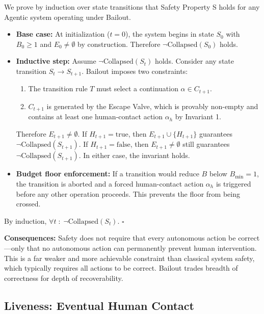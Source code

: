 \begin{Proof}
We prove by induction over state transitions that Safety Property S holds for any Agentic system operating under Bailout.

\begin{itemize}
    \item \textbf{Base case:} At initialization ($t=0$), the system begins in state $S_0$ with $B_0 \geq 1$ and $E_0 \neq \emptyset$ by construction. Therefore $\neg\text{Collapsed}(S_0)$ holds.

    \item \textbf{Inductive step:} Assume $\neg\text{Collapsed}(S_t)$ holds. Consider any state transition $S_t \to S_{t+1}$. Bailout imposes two constraints:
    \begin{enumerate}
        \item The transition rule $T$ must select a continuation $\alpha \in C_{t+1}$.
        \item $C_{t+1}$ is generated by the Escape Valve, which is provably non-empty and contains at least one human-contact action $\alpha_h$ by Invariant 1.
    \end{enumerate}
    Therefore $E_{t+1} \neq \emptyset$. If $H_{t+1}=\text{true}$, then $E_{t+1} \cup \{H_{t+1}\}$ guarantees $\neg\text{Collapsed}(S_{t+1})$. If $H_{t+1}=\text{false}$, then $E_{t+1} \neq \emptyset$ still guarantees $\neg\text{Collapsed}(S_{t+1})$. In either case, the invariant holds.

    \item \textbf{Budget floor enforcement:} If a transition would reduce $B$ below $B_\text{min}=1$, the transition is aborted and a forced human-contact action $\alpha_h$ is triggered before any other operation proceeds. This prevents the floor from being crossed.
\end{itemize}

By induction, $\forall t \;:\; \neg\text{Collapsed}(S_t)$. $\square$
\end{Proof}

\textbf{Consequences:} Safety does not require that every autonomous action be correct—only that no autonomous action can permanently prevent human intervention. This is a far weaker and more achievable constraint than classical system safety, which typically requires all actions to be correct. Bailout trades breadth of correctness for depth of recoverability.

\subsection{Liveness: Eventual Human Contact}

